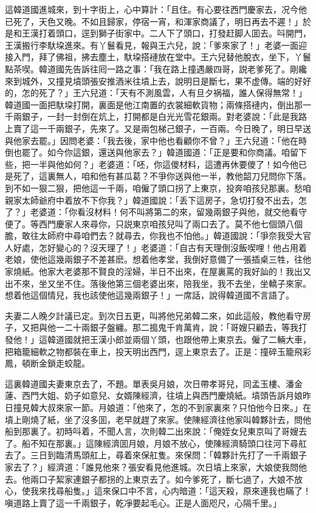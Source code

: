 這韓道國進城來，到十字街上，心中算計：「且住。有心要往西門慶家去，况今他已死了，天色又晚。不如且歸家，停宿一宵，和渾家商議了，明日再去不遲！」於是和王漢打着頭口，逕到獅子街家中。二人下了頭口，打發赶脚人囬去。呌開門，王漢搬行李馱垜進來。有丫鬟看見，報與王六兒，說：「爹來家了！」老婆一面迎接入門，拜了佛祖，拂去塵土，馱垜搭褳放在堂中。王六兒替他脫衣，坐下，丫鬟點茶喫。韓道國先告訴往囘一路之事：「我在路上撞遇嚴四哥，説老爹死了。剛纔來到城外，又撞見墳頭張安推酒米往墳上去，說明日是斷七，果不虚傳。端的好好的，怎的死了？」王六兒道：「天有不測風雲，人有旦夕祸福，誰人保得無常！」韓道國一面把馱垜打開，裏面是他江南置的衣裳細軟貨物；兩條搭褳内，倒出那一千兩銀子，一封一封倒在炕上，打開都是白光光雪花銀兩。對老婆說：「此是我路上賣了這一千兩銀子，先來了。又是兩包梯己銀子，一百兩。今日晚了，明日早送與他家去罷。」因問老婆：「我去後，家中他也看顧你不曾？」王六兒道：「他在時倒也罷了。如今你這銀，還送與他家去？」韓道國道：「正是要和你商議。咱留下些，把一半與他如何？」老婆道：「呸，你這儍材料，這遭再休要儍了！如今他已是死了，這裏無人，咱和他有甚瓜葛？不爭你送與他一半，教他韶刀兒問你下落。到不如一狠二狠，把他這一千兩，咱僱了頭口拐了上東京，投奔咱孩兒那裏。愁咱親家太師爺府中着放不下你我？」韓道國說：「丢下這房子，急切打發不出去，怎了？」老婆道：「你看沒材料！何不叫將第二的來，留幾兩銀子與他，就交他看守便了。等西門慶家人來尋你，只説東京咱孩兒叫了兩口去了。莫不他七個頭八個膽，敢往太師府中尋咱們去？就尋去，你我也不怕他。」韓道國說：「爭奈我受大官人好處，怎好變心的？沒天理了！」老婆道：「自古有天理倒沒飯喫哩！他占用着老娘，使他這幾兩銀子不差甚麽。想着他孝堂，我倒好意備了一張插桌三牲，往他家燒紙。他家大老婆那不賢良的淫婦，半日不出來，在屋裏罵的我好訕的！我出又出不來，坐又坐不住。落後他第三個老婆出來，陪我坐，我不去坐，坐轎子來家。想着他這個情兒，我也該使他這幾兩銀子！」一席話，說得韓道國不言語了。

夫妻二人晚夕計議已定。到次日五更，叫將他兄弟韓二來，如此這般，教他看守房子，又把與他一二十兩銀子盤纏。那二搗鬼千肯萬肯，說：「哥嫂只顧去，等我打發他！」這韓道國就把王漢小郎並兩個丫頭，也跟他帶上東京去。僱了二輛大車，把箱籠細軟之物都裝在車上，投天明出西門，逕上東京去了。正是：撞碎玉籠飛彩鳳，頓断金鎖走蛟龍。

這裏韓道國夫妻東京去了，不題。單表吳月娘，次日帶孝哥兒，同孟玉樓、潘金蓮、西門大姐、奶子如意兒、女婿陳經濟，往墳上與西門慶燒紙。墳頭告訴月娘昨日撞見韓大叔來家一節。月娘道：「他來了，怎的不到家裏來？只怕他今日來。」在墳上剛燒了紙，坐了沒多囬，老早就趕了來家。使陳經濟往他家叫韓夥計去，問他船到那裏了。初時呌着，不聞人言，次則韓二出來說：「俺姪女兒東京叫了哥嫂去了。船不知在那裏。」這陳經濟囬月娘，月娘不放心，使陳經濟騎頭口往河下尋舡去了。三日到臨清馬頭舡上，尋着來保舡隻。來保問：「韓夥計先打了一千兩銀子家去了？」經濟道：「誰見他來？張安看見他進城。次日墳上來家，大娘使我問他去。他兩口子絜家連銀子都拐的上東京去了。如今爹死了，斷七過了，大娘不放心，使我來找尋船隻。」這來保口中不言，心内暗道：「這天殺，原來連我也瞞了！嗔道路上賣了這一千兩銀子，乾凈要起毛心。正是人面咫尺，心隔千里。」

